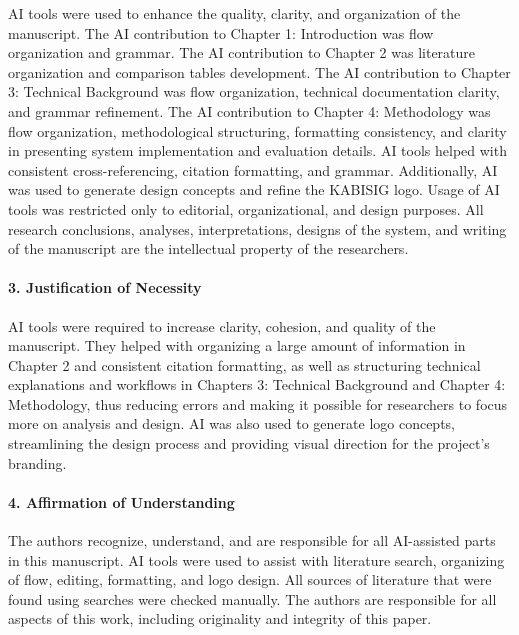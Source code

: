 \hspace*{\parindent} AI tools were used to enhance the quality, clarity, and organization of the manuscript. The AI contribution to Chapter 1: Introduction was flow organization and grammar. The AI contribution to Chapter 2 was literature organization and comparison tables development. The AI contribution to Chapter 3: Technical Background was flow organization, technical documentation clarity, and grammar refinement. The AI contribution to Chapter 4: Methodology was flow organization, methodological structuring, formatting consistency, and clarity in presenting system implementation and evaluation details. AI tools helped with consistent cross-referencing, citation formatting, and grammar. Additionally, AI was used to generate design concepts and refine the KABISIG logo. Usage of AI tools was restricted only to editorial, organizational, and design purposes. All research conclusions, analyses, interpretations, designs of the system, and writing of the manuscript are the intellectual property of the researchers.\vspace{5mm}


\paragraph{3. Justification of Necessity}\hspace*{\parindent}


\hspace*{\parindent} AI tools were required to increase clarity, cohesion, and quality of the manuscript. They helped with organizing a large amount of information in Chapter 2 and consistent citation formatting, as well as structuring technical explanations and workflows in Chapters 3: Technical Background and Chapter 4: Methodology, thus reducing errors and making it possible for researchers to focus more on analysis and design. AI was also used to generate logo concepts, streamlining the design process and providing visual direction for the project's branding.\vspace{5mm}


\paragraph{4. Affirmation of Understanding}\hspace*{\parindent}


\hspace*{\parindent} The authors recognize, understand, and are responsible for all AI-assisted parts in this manuscript. AI tools were used to assist with literature search, organizing of flow, editing, formatting, and logo design. All sources of literature that were found using searches were checked manually. The authors are responsible for all aspects of this work, including originality and integrity of this paper.